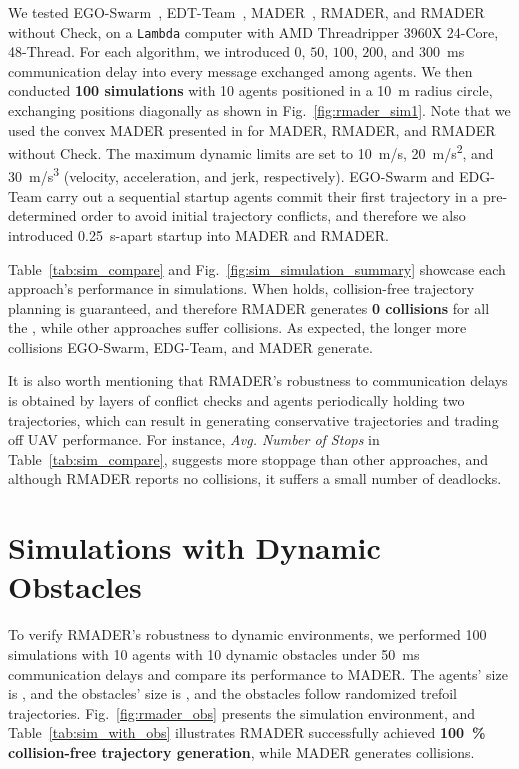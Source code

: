 We tested EGO-Swarm~\cite{zhou_ego-swarm_2020}, EDT-Team~\cite{hou_enhanced_2022}, MADER~\cite{tordesillas_mader_2022}, RMADER, and RMADER without Check, on a \texttt{Lambda} computer with AMD Threadripper 3960X 24-Core, 48-Thread. 
For each algorithm, we introduced $0$, $50$, $100$, $200$, and \SI{300}{\ms} communication delay into every message exchanged among agents. 
We then conducted \textbf{100 simulations} with 10 agents positioned in a \SI{10}{\m} radius circle, exchanging positions diagonally as shown in Fig.~\ref{fig:rmader_sim1}.
Note that we used the convex MADER presented in \cite{kondo2022robust} for MADER, RMADER, and RMADER without Check.
The maximum dynamic limits are set to \SI{10}{\m/\s}, \SI{20}{\m/\s^2}, and \SI{30}{\m/\s^3} (velocity, acceleration, and jerk, respectively).
EGO-Swarm and EDG-Team carry out a sequential startup \textemdash agents commit their first trajectory in a pre-determined order to avoid initial trajectory conflicts, and therefore we also introduced \SI{0.25}{\second}-apart startup into MADER and RMADER. 

Table~\ref{tab:sim_compare} and Fig.~\ref{fig:sim_simulation_summary} showcase each approach's performance in simulations. 
When \NeccessaryCond{} holds, collision-free trajectory planning is guaranteed, and therefore RMADER generates \textbf{0 collisions} for all the \delayIntroduced{}, while other approaches suffer collisions. 
As expected, the longer \delayIntroduced{} more collisions EGO-Swarm, EDG-Team, and MADER generate.

It is also worth mentioning that RMADER's robustness to communication delays is obtained by layers of conflict checks and agents periodically holding two trajectories, which can result in generating conservative trajectories and trading off UAV performance. 
For instance, \emph{Avg. Number of Stops} in Table~\ref{tab:sim_compare}, suggests more stoppage than other approaches, and although RMADER reports no collisions, it suffers a small number of deadlocks.

\section{Simulations with Dynamic Obstacles}

To verify RMADER's robustness to dynamic environments, we performed 100 simulations with 10 agents with 10 dynamic obstacles under \SI{50}{\ms} communication delays and compare its performance to MADER. The agents' size is , and the obstacles' size is , and the obstacles follow randomized trefoil trajectories. Fig.~\ref{fig:rmader_obs} presents the simulation environment, and Table~\ref{tab:sim_with_obs} illustrates RMADER successfully achieved \textbf{\SI{100}{\%} collision-free trajectory generation}, while MADER generates collisions.

